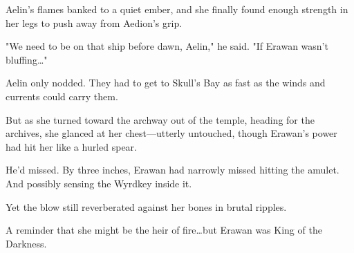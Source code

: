 Aelin's flames banked to a quiet ember, and she finally found enough strength in her legs to push away from Aedion's grip.

"We need to be on that ship before dawn, Aelin," he said.
"If Erawan wasn't bluffing\ldots"

Aelin only nodded.
They had to get to Skull's Bay as fast as the winds and currents could carry them.

But as she turned toward the archway out of the temple, heading for the archives, she glanced at her chest---utterly untouched, though Erawan's power had hit her like a hurled spear.

He'd missed.
By three inches, Erawan had narrowly missed hitting the amulet.
And possibly sensing the Wyrdkey inside it.

Yet the blow still reverberated against her bones in brutal ripples.

A reminder that she might be the heir of fire\ldots but Erawan was King of the Darkness.
